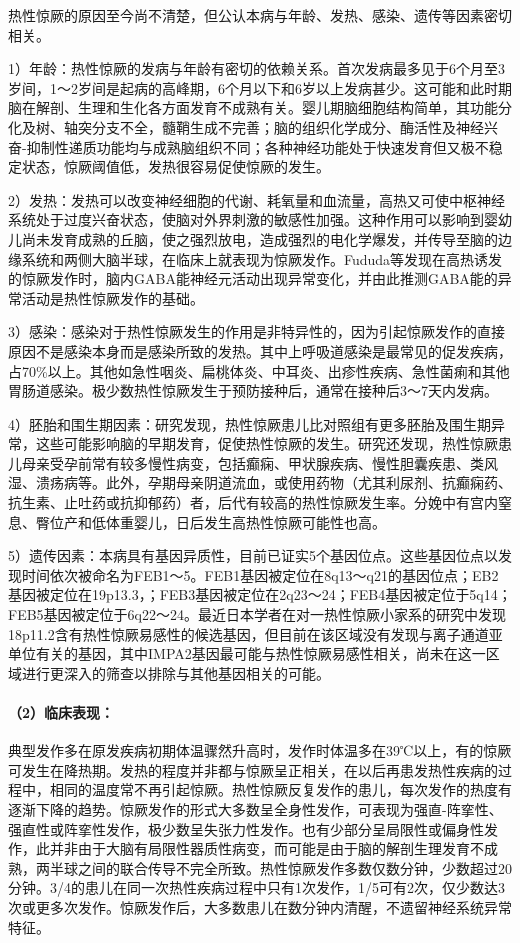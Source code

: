 热性惊厥的原因至今尚不清楚，但公认本病与年龄、发热、感染、遗传等因素密切相关。

1）年龄：热性惊厥的发病与年龄有密切的依赖关系。首次发病最多见于6个月至3岁间，1～2岁间是起病的高峰期，6个月以下和6岁以上发病甚少。这可能和此时期脑在解剖、生理和生化各方面发育不成熟有关。婴儿期脑细胞结构简单，其功能分化及树、轴突分支不全，髓鞘生成不完善；脑的组织化学成分、酶活性及神经兴奋-抑制性递质功能均与成熟脑组织不同；各种神经功能处于快速发育但又极不稳定状态，惊厥阈值低，发热很容易促使惊厥的发生。

2）发热：发热可以改变神经细胞的代谢、耗氧量和血流量，高热又可使中枢神经系统处于过度兴奋状态，使脑对外界刺激的敏感性加强。这种作用可以影响到婴幼儿尚未发育成熟的丘脑，使之强烈放电，造成强烈的电化学爆发，并传导至脑的边缘系统和两侧大脑半球，在临床上就表现为惊厥发作。Fududa等发现在高热诱发的惊厥发作时，脑内GABA能神经元活动出现异常变化，并由此推测GABA能的异常活动是热性惊厥发作的基础。

3）感染：感染对于热性惊厥发生的作用是非特异性的，因为引起惊厥发作的直接原因不是感染本身而是感染所致的发热。其中上呼吸道感染是最常见的促发疾病，占70\%以上。其他如急性咽炎、扁桃体炎、中耳炎、出疹性疾病、急性菌痢和其他胃肠道感染。极少数热性惊厥发生于预防接种后，通常在接种后3～7天内发病。

4）胚胎和围生期因素：研究发现，热性惊厥患儿比对照组有更多胚胎及围生期异常，这些可能影响脑的早期发育，促使热性惊厥的发生。研究还发现，热性惊厥患儿母亲受孕前常有较多慢性病变，包括癫痫、甲状腺疾病、慢性胆囊疾患、类风湿、溃疡病等。此外，孕期母亲阴道流血，或使用药物（尤其利尿剂、抗癫痫药、抗生素、止吐药或抗抑郁药）者，后代有较高的热性惊厥发生率。分娩中有宫内窒息、臀位产和低体重婴儿，日后发生高热性惊厥可能性也高。

5）遗传因素：本病具有基因异质性，目前已证实5个基因位点。这些基因位点以发现时间依次被命名为FEB1～5。FEB1基因被定位在8q13～q21的基因位点；EB2基因被定位在19p13.3，；FEB3基因被定位在2q23～24；FEB4基因被定位于5q14；FEB5基因被定位于6q22～24。最近日本学者在对一热性惊厥小家系的研究中发现18p11.2含有热性惊厥易感性的候选基因，但目前在该区域没有发现与离子通道亚单位有关的基因，其中IMPA2基因最可能与热性惊厥易感性相关，尚未在这一区域进行更深入的筛查以排除与其他基因相关的可能。

\paragraph{（2）临床表现：}

典型发作多在原发疾病初期体温骤然升高时，发作时体温多在39℃以上，有的惊厥可发生在降热期。发热的程度并非都与惊厥呈正相关，在以后再患发热性疾病的过程中，相同的温度常不再引起惊厥。热性惊厥反复发作的患儿，每次发作的热度有逐渐下降的趋势。惊厥发作的形式大多数呈全身性发作，可表现为强直-阵挛性、强直性或阵挛性发作，极少数呈失张力性发作。也有少部分呈局限性或偏身性发作，此并非由于大脑有局限性器质性病变，而可能是由于脑的解剖生理发育不成熟，两半球之间的联合传导不完全所致。热性惊厥发作多数仅数分钟，少数超过20分钟。3/4的患儿在同一次热性疾病过程中只有1次发作，1/5可有2次，仅少数达3次或更多次发作。惊厥发作后，大多数患儿在数分钟内清醒，不遗留神经系统异常特征。

